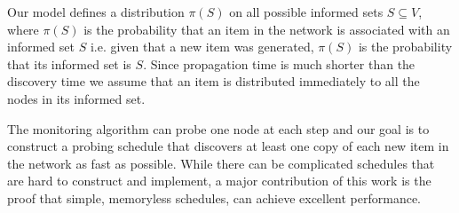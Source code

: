 Our model defines a distribution  $\pi(S)$ on all possible informed sets $S\subseteq V$, where $\pi(S)$ is the probability that an item in the network is associated with an informed set $S$ i.e.
given that a new item was generated, $\pi(S)$ is the probability that its informed set is $S$.
 Since propagation time is much shorter than the discovery time we assume that an item is distributed immediately to all the nodes in its informed set.
%
%
%
%
%

The monitoring algorithm can probe one node at each step
and our goal is to construct a probing schedule that discovers at least one copy of each new item in the network as fast as possible.
While there can be complicated schedules that are hard to construct and implement, a major contribution of this work is the proof that simple, memoryless schedules, can achieve excellent performance.

